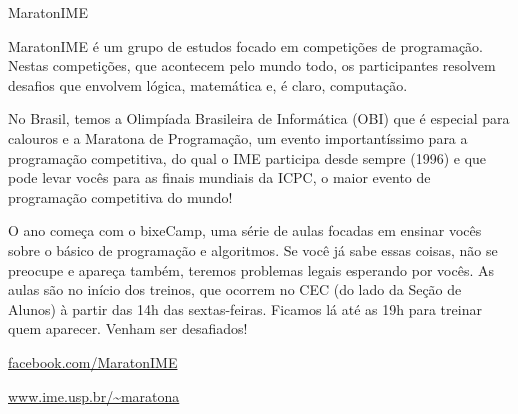 \begin{subsecao}{MaratonIME}


MaratonIME é um grupo de estudos focado em competições de programação. Nestas
competições, que acontecem pelo mundo todo, os participantes resolvem desafios
que envolvem lógica, matemática e, é claro, computação.

No Brasil, temos a Olimpíada Brasileira de Informática (OBI) que é especial para
calouros e a Maratona de Programação, um evento importantíssimo para a
programação competitiva, do qual o IME participa desde sempre (1996) e que pode
levar vocês para as finais mundiais da ICPC, o maior evento de programação
competitiva do mundo!

O ano começa com o bixeCamp, uma série de aulas focadas em ensinar vocês sobre o
básico de programação e algoritmos. Se você já sabe essas coisas, não se
preocupe e apareça também, teremos problemas legais esperando por vocês. As
aulas são no início dos treinos, que ocorrem no CEC (do lado da Seção de Alunos)
à partir das 14h das sextas-feiras. Ficamos lá até as 19h para treinar quem
aparecer. Venham ser desafiados!


\begin{center}
  \Large
  \url{facebook.com/MaratonIME}

  \url{www.ime.usp.br/~maratona}
\end{center}

\end{subsecao}
